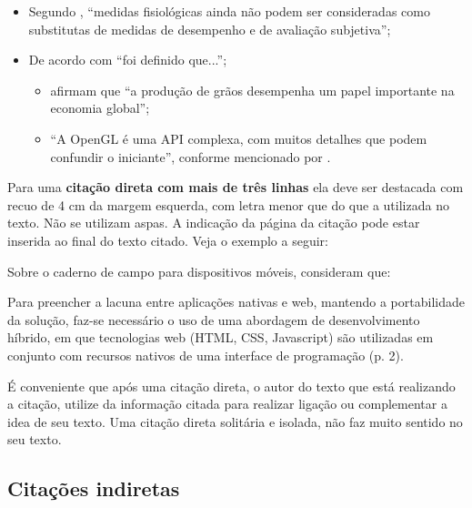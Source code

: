 \begin{itemize}
    \item Segundo \citet[p.~27]{RIE11}, ``medidas fisiológicas ainda não podem ser consideradas como substitutas de medidas de desempenho e de avaliação subjetiva'';
	
    \item De acordo com \cite{Lopes2023} ``foi definido que...'';

    \begin{itemize}
        \item \cite{patricio2018computer} afirmam que ``a produção de grãos desempenha um papel importante na economia global'';
        
        \item ``A OpenGL é uma API complexa, com muitos detalhes que podem confundir o iniciante'', conforme mencionado por \citet[cap.~3]{COH06}.
    \end{itemize}
\end{itemize}

Para uma \textbf{citação direta com mais de três linhas} ela deve ser destacada com recuo de 4 cm da margem esquerda, com letra menor que do que a utilizada no texto. Não se utilizam aspas. A indicação da página da citação pode estar inserida ao final do texto citado. Veja o exemplo a seguir:

Sobre o caderno de campo para dispositivos móveis, \cite{SIL13} consideram que:
\begin{directcite}
	\noindent Para preencher a lacuna entre aplicações nativas e web, mantendo a portabilidade da solução, faz-se necessário o uso de uma abordagem de desenvolvimento híbrido, em que tecnologias web (HTML, CSS, Javascript) são utilizadas em conjunto com recursos nativos de uma interface de programação (p. 2).
\end{directcite}

É conveniente que após uma citação direta, o autor do texto que está realizando a citação, utilize da informação citada para realizar ligação ou complementar a idea de seu texto. Uma citação direta solitária e isolada, não faz muito sentido no seu texto.

\subsection{Citações indiretas}

